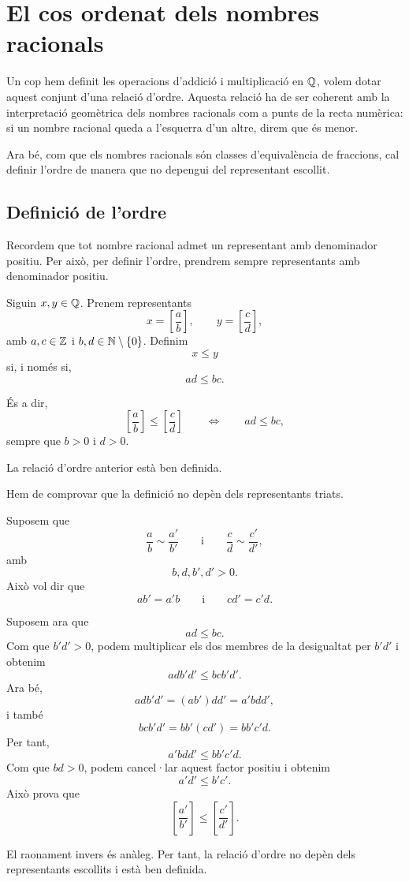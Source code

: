 \section{El cos ordenat dels nombres racionals}
\label{sec:cos-ordenat-racionals}

Un cop hem definit les operacions d'addició i multiplicació en \(\mathbb{Q}\), volem dotar aquest conjunt d'una relació d'ordre. Aquesta relació ha de ser coherent amb la interpretació geomètrica dels nombres racionals com a punts de la recta numèrica: si un nombre racional queda a l'esquerra d'un altre, direm que és menor.

Ara bé, com que els nombres racionals són classes d'equivalència de fraccions, cal definir l'ordre de manera que no depengui del representant escollit.

\subsection{Definició de l'ordre}

Recordem que tot nombre racional admet un representant amb denominador positiu. Per això, per definir l'ordre, prendrem sempre representants amb denominador positiu.

\begin{definicio}
Siguin \(x,y\in\mathbb{Q}\). Prenem representants
\[
	x=\left[\frac{a}{b}\right],
	\qquad
	y=\left[\frac{c}{d}\right],
\]
amb \(a,c\in\mathbb{Z}\) i \(b,d\in\mathbb{N}\setminus\{0\}\). Definim
\[
	x\leq y
\]
si, i només si,
\[
	ad\leq bc.
\]
\end{definicio}

És a dir,
\[
	\left[\frac{a}{b}\right]\leq
	\left[\frac{c}{d}\right]
	\qquad\Longleftrightarrow\qquad
	ad\leq bc,
\]
sempre que \(b>0\) i \(d>0\).

\begin{proposicio}
La relació d'ordre anterior està ben definida.
\end{proposicio}

\begin{prova}
Hem de comprovar que la definició no depèn dels representants triats.

Suposem que
\[
	\frac{a}{b}\sim\frac{a'}{b'}
	\qquad\text{i}\qquad
	\frac{c}{d}\sim\frac{c'}{d'},
\]
amb
\[
	b,d,b',d'>0.
\]
Això vol dir que
\[
	ab'=a'b
	\qquad\text{i}\qquad
	cd'=c'd.
\]

Suposem ara que
\[
	ad\leq bc.
\]
Com que \(b'd'>0\), podem multiplicar els dos membres de la desigualtat per \(b'd'\) i obtenim
\[
	adb'd'\leq bcb'd'.
\]
Ara bé,
\[
	adb'd'=(ab')dd'=a'bdd',
\]
i també
\[
	bcb'd'=bb'(cd')=bb'c'd.
\]
Per tant,
\[
	a'bdd'\leq bb'c'd.
\]
Com que \(bd>0\), podem cancel·lar aquest factor positiu i obtenim
\[
	a'd'\leq b'c'.
\]
Això prova que
\[
	\left[\frac{a'}{b'}\right]\leq
	\left[\frac{c'}{d'}\right].
\]

El raonament invers és anàleg. Per tant, la relació d'ordre no depèn dels representants escollits i està ben definida.
\end{prova}

